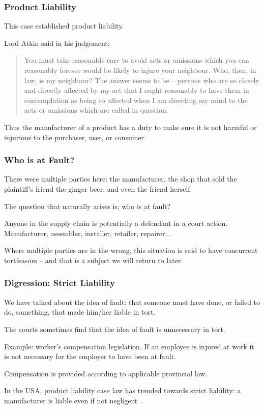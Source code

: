 \begin{frame}
\frametitle{Product Liability}

This case established product liability. 

Lord Atkin said in his judgement:



\begin{quote}
You must take reasonable care to avoid acts or omissions which you can reasonably foresee would be likely to injure your neighbour. Who, then, in law, is my neighbour? The answer seems to be -- persons who are so closely and directly affected by my act that I ought reasonably to have them in contemplation as being so affected when I am directing my mind to the acts or omissions which are called in question.
\end{quote}

Thus the manufacturer of a product has a duty to make sure it is not harmful or injurious to the purchaser, user, or consumer.

\end{frame}



\begin{frame}
\frametitle{Who is at Fault?}


There were multiple parties here: the manufacturer, the shop that sold the plaintiff's friend the ginger beer, and even the friend herself.

The question that naturally arises is: who is at fault?

Anyone in the supply chain is potentially a defendant in a court action.\\
\quad Manufacturer, assembler, installer, retailer, repairer...

Where multiple parties are in the wrong, this situation is said to have \alert{concurrent tortfeasors} -- and that is a subject we will return to later.

\end{frame}



\begin{frame}
\frametitle{Digression: Strict Liability}

We have talked about the idea of fault: that someone must have done, or failed to do, something, that made him/her liable in tort.

The courts sometimes find that the idea of fault is unnecessary in tort.

Example: worker's compensation legislation. If an employee is injured at work it is not necessary for the employer to have been at fault.

Compensation is provided according to applicable provincial law.

In the USA, product liability case law has trended towards strict liability: a manufacturer is liable even if not negligent~\cite{lpe}.

\end{frame}


